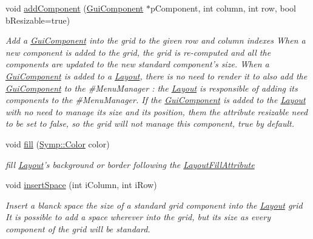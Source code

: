 \begin{DoxyCompactItemize}
\item 
void \hyperlink{class_symp_1_1_layout_a86daa8cdec516e9d469dc09ca2e2c3d6}{add\-Component} (\hyperlink{class_symp_1_1_gui_component}{Gui\-Component} $\ast$p\-Component, int column, int row, bool b\-Resizable=true)
\begin{DoxyCompactList}\small\item\em Add a \hyperlink{class_symp_1_1_gui_component_a22124675c2976983ac18374f81cc3fb3}{Gui\-Component} into the grid to the given row and column indexes When a new component is added to the grid, the grid is re-\/computed and all the components are updated to the new standard component's size. When a \hyperlink{class_symp_1_1_gui_component_a22124675c2976983ac18374f81cc3fb3}{Gui\-Component} is added to a \hyperlink{class_symp_1_1_layout_acd02d4152c342a37567cbbdcec57814f}{Layout}, there is no need to render it to also add the \hyperlink{class_symp_1_1_gui_component_a22124675c2976983ac18374f81cc3fb3}{Gui\-Component} to the \#\-Menu\-Manager \-: the \hyperlink{class_symp_1_1_layout_acd02d4152c342a37567cbbdcec57814f}{Layout} is responsible of adding its components to the \#\-Menu\-Manager. If the \hyperlink{class_symp_1_1_gui_component_a22124675c2976983ac18374f81cc3fb3}{Gui\-Component} is added to the \hyperlink{class_symp_1_1_layout_acd02d4152c342a37567cbbdcec57814f}{Layout} with no need to manage its size and its position, them the attribute resizable need to be set to false, so the grid will not manage this component, true by default. \end{DoxyCompactList}\item 
void \hyperlink{class_symp_1_1_layout_a09bfa1d705aa85fdc81d8b38a871af32}{fill} (\hyperlink{struct_symp_1_1_color}{Symp\-::\-Color} color)
\begin{DoxyCompactList}\small\item\em fill \hyperlink{class_symp_1_1_layout_acd02d4152c342a37567cbbdcec57814f}{Layout}'s background or border following the \hyperlink{namespace_symp_a30499696a7501e2c08fdf0b3094484fb}{Layout\-Fill\-Attribute} \end{DoxyCompactList}\item 
void \hyperlink{class_symp_1_1_layout_a915da50f7032eb8823f86e326ee57ec1}{insert\-Space} (int i\-Column, int i\-Row)
\begin{DoxyCompactList}\small\item\em Insert a blanck space the size of a standard grid component into the \hyperlink{class_symp_1_1_layout_acd02d4152c342a37567cbbdcec57814f}{Layout} grid It is possible to add a space wherever into the grid, but its size as every component of the grid will be standard. \end{DoxyCompactList}\item 

\end{DoxyCompactItemize}
